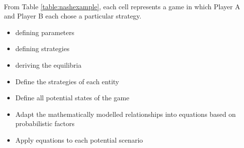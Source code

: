 \paragraph{} From Table \ref{table:nashexample}, each cell represents a game in which Player A and Player B each chose a particular strategy.

\begin{itemize}
  \item defining parameters
  \item defining strategies
  \item deriving the equilibria
\end{itemize}

\begin{itemize}
  \item Define the strategies of each entity
  \item Define all potential states of the game
  \item Adapt the mathematically modelled relationships into equations based on probabilistic factors
  \item Apply equations to each potential scenario
\end{itemize}